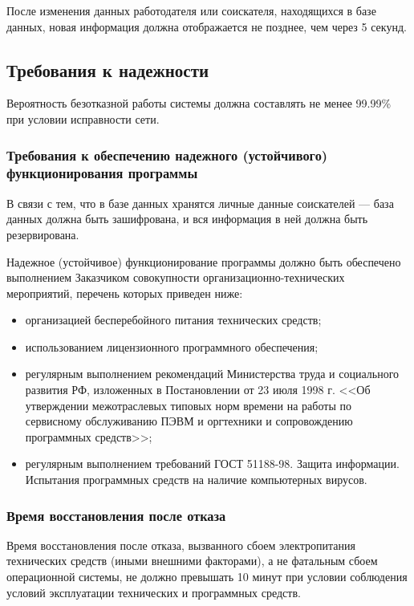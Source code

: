 \documentclass[a4page]{article}
\begin{document}
После изменения данных работодателя или соискателя, находящихся в базе данных, новая информация должна отображается не позднее, чем через 5 секунд.

\subsection{Требования к надежности}

Вероятность безотказной работы системы должна составлять не менее 99.99\% при условии исправности сети.

\subsubsection{Требования к обеспечению надежного (устойчивого) функционирования программы}

В связи с тем, что в базе данных хранятся личные данные соискателей --- база данных должна быть зашифрована, и вся информация в ней должна быть резервирована.

Надежное (устойчивое) функционирование программы должно быть обеспечено выполнением Заказчиком совокупности организационно-технических мероприятий, перечень которых приведен ниже:

\begin{itemize}
  \item организацией бесперебойного питания технических средств;
  \item использованием лицензионного программного обеспечения;
  \item регулярным выполнением рекомендаций Министерства труда и социального развития РФ, изложенных в Постановлении от 23 июля 1998 г. <<Об утверждении межотраслевых типовых норм времени на работы по сервисному обслуживанию ПЭВМ и оргтехники и сопровождению программных средств>>;
  \item регулярным выполнением требований ГОСТ 51188-98. Защита информации. Испытания программных средств на наличие компьютерных вирусов.
\end{itemize}

\subsubsection{Время восстановления после отказа}

Время восстановления после отказа, вызванного сбоем электропитания технических средств (иными внешними факторами), а не фатальным сбоем операционной системы, не должно превышать 10 минут при условии соблюдения условий эксплуатации технических и программных средств.
\end{document}
